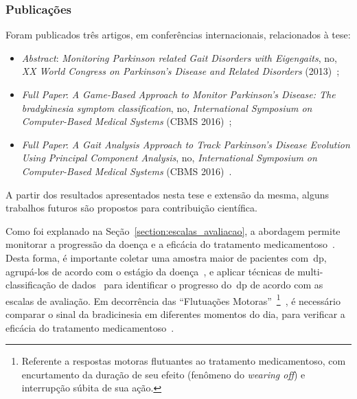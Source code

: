 \subsubsection{Publicações}
Foram publicados três artigos, em conferências internacionais, relacionados à tese: 
  \begin{itemize}
   \item \textit{Abstract}: \textit{Monitoring Parkinson related Gait Disorders with Eigengaits}, no, \textit{XX World Congress on Parkinson's Disease and Related Disorders} (2013)~\cite{lmmeigengaits2013};
   \item \textit{Full Paper}: \textit{A Game-Based Approach to Monitor Parkinson’s Disease: The bradykinesia symptom classification}, no, \textit{International Symposium on Computer-Based Medical Systems} (CBMS 2016)~\cite{lmmcbmsgame2016};
   \item \textit{Full Paper}: \textit{A Gait Analysis Approach to Track Parkinson’s Disease Evolution Using Principal Component Analysis}, no, \textit{International Symposium on Computer-Based Medical Systems} (CBMS 2016)~\cite{lmmcbmsgait2016}.
  \end{itemize}

A partir dos resultados apresentados nesta tese e extensão da mesma, alguns trabalhos futuros são propostos para contribuição científica.

Como foi explanado na Seção~\ref{section:escalas_avaliacao}, a abordagem permite monitorar a progressão da doença e a eficácia do tratamento medicamentoso~\cite{updrs87,goul05}. Desta forma, é importante coletar uma amostra maior de pacientes com~\ac{dp}, agrupá-los de acordo com o estágio da doença~\cite{goul05}, e aplicar técnicas de multi-classificação de dados~\cite{multisvm2011} para identificar o progresso do~\ac{dp} de acordo com as escalas de avaliação. Em decorrência das ``Flutuações Motoras''~\footnote{Referente a respostas motoras flutuantes ao tratamento medicamentoso, com encurtamento da duração de seu efeito (fenômeno do \textit{wearing off}) e interrupção súbita de sua ação.}~\cite{protpar010},  é necessário comparar o sinal da bradicinesia em diferentes momentos do dia, para verificar a eficácia do tratamento medicamentoso~\cite{protpar010}.

